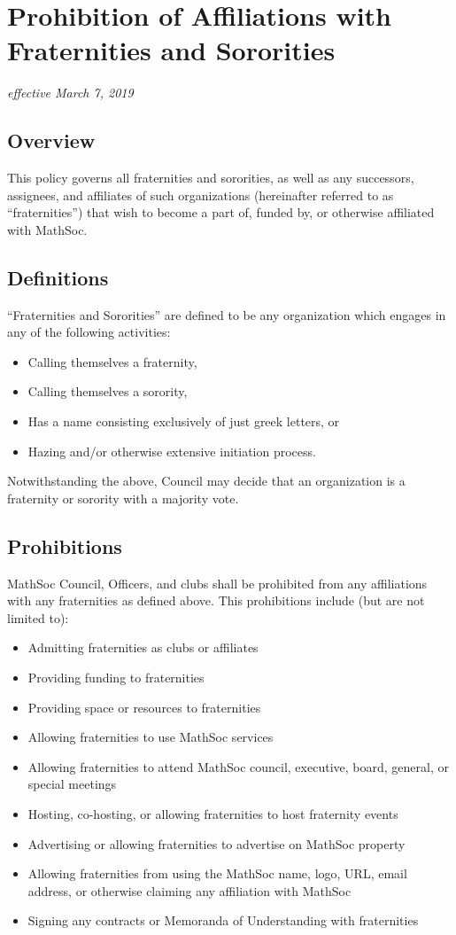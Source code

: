 \section{Prohibition of Affiliations with Fraternities and Sororities}
\emph{effective March 7, 2019}

\subsection{Overview}
This policy governs all fraternities and sororities, as well as any successors, assignees, and affiliates of such organizations (hereinafter referred to as ``fraternities'') that wish to become a part of, funded by, or otherwise affiliated with MathSoc.

\subsection{Definitions}
``Fraternities and Sororities'' are defined to be any organization which engages in any of the following activities:
\begin{itemize}
    \item Calling themselves a fraternity,
    \item Calling themselves a sorority,
    \item Has a name consisting exclusively of just greek letters, or 
    \item Hazing and/or otherwise extensive initiation process.
\end{itemize}

Notwithstanding the above, Council may decide that an organization is a fraternity or sorority with a majority vote.

\subsection{Prohibitions}

MathSoc Council, Officers, and clubs shall be prohibited from any affiliations with any fraternities as defined above. This prohibitions include (but are not limited to):

\begin{itemize}
\item Admitting fraternities as clubs or affiliates
\item Providing funding to fraternities
\item Providing space or resources to fraternities
\item Allowing fraternities to use MathSoc services
\item Allowing fraternities to attend MathSoc council, executive, board, general, or special meetings
\item Hosting, co-hosting, or allowing fraternities to host fraternity events
\item Advertising or allowing fraternities to advertise on MathSoc property
\item Allowing fraternities from using the MathSoc name, logo, URL, email address, or otherwise claiming any affiliation with MathSoc
\item Signing any contracts or Memoranda of Understanding with fraternities
\end{itemize}

